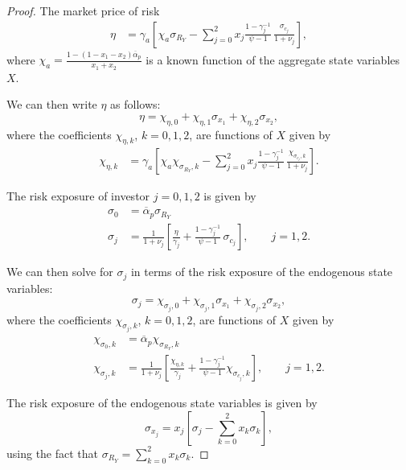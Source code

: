 \begin{proof}
    The market price of risk 
    \begin{align}
        \eta &= \gamma_{a} \left[\chi_{a}\sigma_{R_Y} - \sum_{j=0}^2 x_{j} \frac{1-\gamma_j^{-1}}{\psi-1} \, \frac{\sigma_{c_j}}{1+\nu_{j}}\right],
    \end{align}
    where $\chi_{a} =\frac{1 - (1-x_{1}-x_{2}) \overline{\alpha}_{p}}{x_{1}+x_{2}}$ is a known function of the aggregate state variables $X$.
    
    We can then write $\eta$ as follows:
    \begin{equation}
        \eta = \chi_{\eta,0} + \chi_{\eta,1} \sigma_{x_1} + \chi_{\eta,2} \sigma_{x_2},
    \end{equation}
    where the coefficients $\chi_{\eta,k}$, $k=0,1,2$, are functions of $X$ given by 
    \begin{align}
        \chi_{\eta,k} &= \gamma_{a} \left[ \chi_{a}\chi_{\sigma_{R_Y},k} - \sum_{j=0}^2 x_{j} \frac{1-\gamma_j^{-1}}{\psi-1} \, \frac{\chi_{\sigma_{c_j},k}}{1+\nu_{j}}\right].
    \end{align}


    The risk exposure of investor $j = 0,1,2$ is given by
    \begin{align}
        \sigma_{0} &= \overline{\alpha}_{p} \sigma_{R_Y}\\
        \sigma_{j} &= \frac{1}{1+\nu_{j}} \left[ \frac{\eta}{\gamma_j} + \frac{1-\gamma_j^{-1}}{\psi-1} \, \sigma_{c_j} \right], \qquad j=1,2.
    \end{align}

    
    We can then solve for $\sigma_{j}$ in terms of the risk exposure of the endogenous state variables:
    \begin{equation}
        \sigma_{j} = \chi_{\sigma_j,0} + \chi_{\sigma_j,1} \sigma_{x_1} + \chi_{\sigma_j,2} \sigma_{x_2},
    \end{equation}
    where the coefficients $\chi_{\sigma_j,k}$, $k=0,1,2$, are functions of $X$ given by 
    \begin{align}
        \chi_{\sigma_0,k} &= \overline{\alpha}_{p} \chi_{\sigma_{R_Y},k}\\
        \chi_{\sigma_j,k} &= \frac{1}{1+\nu_{j}} \left[ \frac{\chi_{\eta,k}}{\gamma_j} + \frac{1-\gamma_j^{-1}}{\psi-1} \chi_{\sigma_{c_j},k} \right], \qquad j=1,2.
    \end{align}

    The risk exposure of the endogenous state variables is given by
    \begin{equation}
        \sigma_{x_j} = x_{j} \left[ \sigma_{j} -  \sum_{k=0}^2 x_{k} \sigma_{k}  \right],
    \end{equation}
    using the fact that $\sigma_{R_Y} = \sum_{k=0}^2 x_{k} \sigma_{k}$.
    

\end{proof}
